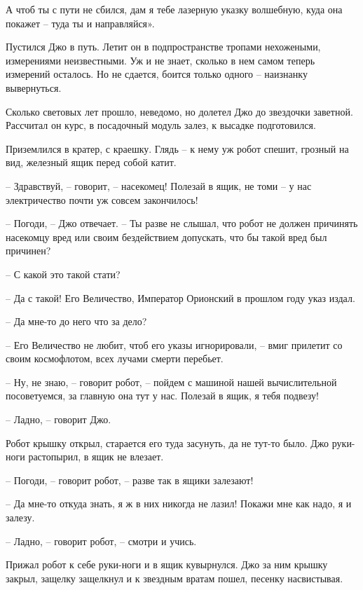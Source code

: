 \documentclass[ebook,oneside,final,openright]{memoir}
\begin{document}
\par
А чтоб ты с пути не сбился, дам я тебе лазерную указку волшебную, куда она покажет – туда ты и направляйся».\par
\par
Пустился Джо в путь. Летит он в подпространстве тропами нехожеными, измерениями неизвестными. Уж и не знает, сколько в нем самом теперь измерений осталось. Но не сдается, боится только одного – наизнанку вывернуться.\par
\par
Сколько световых лет прошло, неведомо, но долетел Джо до звездочки заветной. Рассчитал он курс, в посадочный модуль залез, к высадке подготовился.\par
\par
Приземлился в кратер, с краешку. Глядь – к нему уж робот спешит, грозный на вид, железный ящик перед собой катит.\par
– Здравствуй, – говорит, – насекомец! Полезай в ящик, не томи – у нас электричество почти уж совсем закончилось!\par
– Погоди, – Джо отвечает. – Ты разве не слышал, что робот не должен причинять насекомцу вред или своим бездействием допускать, что бы такой вред был причинен?\par
– С какой это такой стати?\par
– Да с такой! Его Величество, Император Орионский в прошлом году указ издал.\par
– Да мне-то до него что за дело?\par
– Его Величество не любит, чтоб его указы игнорировали, – вмиг прилетит со своим космофлотом, всех лучами смерти перебьет.\par
– Ну, не знаю, – говорит робот, – пойдем с машиной нашей вычислительной посоветуемся, за главную она тут у нас. Полезай в ящик, я тебя подвезу!\par
– Ладно, – говорит Джо.\par
Робот крышку открыл, старается его туда засунуть, да не тут-то было. Джо руки-ноги растопырил, в ящик не влезает. \par
– Погоди, – говорит робот, – разве так в ящики залезают! \par
– Да мне-то откуда знать, я ж в них никогда не лазил! Покажи мне как надо, я и залезу. \par
– Ладно, – говорит робот, – смотри и учись. \par
Прижал робот к себе руки-ноги и в ящик кувырнулся. Джо за ним крышку закрыл, защелку защелкнул и к звездным вратам пошел, песенку насвистывая.\par
\end{document}
